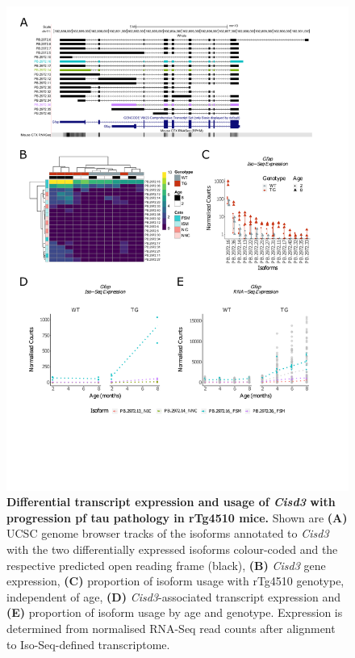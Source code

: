 \newpage
\begin{figure}[!htp]
	\centering
	\includegraphics[page=4,trim={1.5cm 3.5cm 2cm 1cm}, scale = 0.80]{Figures/Ch5_DiffPlots.pdf}
	\captionsetup{width=0.95\textwidth}
	\caption[Differential \textit{Cisd3} transcript expression and usage]%
	{\textbf{Differential transcript expression and usage of \textit{Cisd3} with progression pf tau pathology in rTg4510 mice.} Shown are \textbf{(A)} UCSC genome browser tracks of the isoforms annotated to \textit{Cisd3} with the two differentially expressed isoforms colour-coded and the respective predicted open reading frame (black), \textbf{(B)} \textit{Cisd3} gene expression, \textbf{(C)} proportion of isoform usage with rTg4510 genotype, independent of age, \textbf{(D)} \textit{Cisd3}-associated transcript expression and \textbf{(E)} proportion of isoform usage by age and genotype. Expression is determined from normalised RNA-Seq read counts after alignment to Iso-Seq-defined transcriptome.}    
	\label{fig:DIU_Cisd3}
\end{figure}

